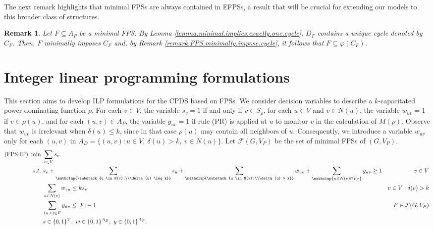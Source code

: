 \documentclass{article}
\newcommand{\FF}{{\mathcal F}}
\newcommand{\FPSIP}{FPS-IP\xspace}
\newtheorem{remark}{Remark}
\begin{document}
The next remark highlights that minimal FPSs are always contained in EFPSs, a result that will be crucial for extending our models to this broader class of structures.

\begin{remark}\label{remark.fps.replaced.by.efps}
Let $F \subseteq A_P$ be a minimal FPS.
By Lemma \ref{lemma.minimal.implies.exactly.one.cycle}, $D_F$ contains a unique cycle denoted by $C_{F}$.
Then, $F$ minimally imposes $C_{F}$ and, by Remark \ref{remark.FPS.minimally.impose.cycle}, it follows that $F \subseteq \varphi(C_F)$.
\end{remark}

\section{Integer linear programming formulations}\label{sec.fpsip}

This section aims to develop ILP formulations for the CPDS based on FPSs.
We consider decision variables to describe a $k$-capacitated power dominating function $\rho$.
For each $v \in V$, the variable $s_v = 1$ if and only if $v \in S_{\rho}$, for each $u \in V$ and $v \in N(u)$, the variable $w_{uv} = 1$ if $v \in \rho(u)$, and for each $(u,v) \in A_P$, the variable $y_{uv} = 1$ if rule (PR) is applied at $u$ to monitor $v$ in the calculation of $M(\rho)$.
Observe that $w_{uv}$ is irrelevant when $\delta(u) \leq k$, since in that case $\rho(u)$ may contain all neighbors of $u$. 
Consequently, we introduce a variable $w_{uv}$ only for each $(u,v)$ in $A_D = \{(u,v): u \in V,\ \delta(u) > k,\ v \in N(u) \}$.
Let $\FF(G,V_P)$ be the set of minimal FPSs of $(G,V_P)$.
\begin{align}
\text{(\FPSIP)}\ \min\  & \sum_{v \in V} s_v \label{FPSIP.ObjFun}\\
s.t.\  & s_v + \sum_{\mathclap{\substack{u \in N(v):\\\delta(u) \leq k}}} s_u + \sum_{\mathclap{\substack{u \in N(v):\\\delta(u) > k}}} w_{uv} + \sum_{\mathclap{u \in N(v) \cap V_P}} y_{uv} \geq 1 & v \in V \label{FPSIP.R1}\\
& \sum_{u \in N(v)} w_{vu} \leq ks_v & v \in V: \delta(v) > k \label{FPSIP.R2}\\
& \sum_{(u,v) \in F} y_{uv} \leq |F|-1 & F \in \FF(G,V_P) \label{FPSIP.R3}\\
& s \in \{0,1\}^V,\ w \in \{0,1\}^{A_D},\ y \in \{0,1\}^{A_P}. \notag
\end{align}
\end{document}

